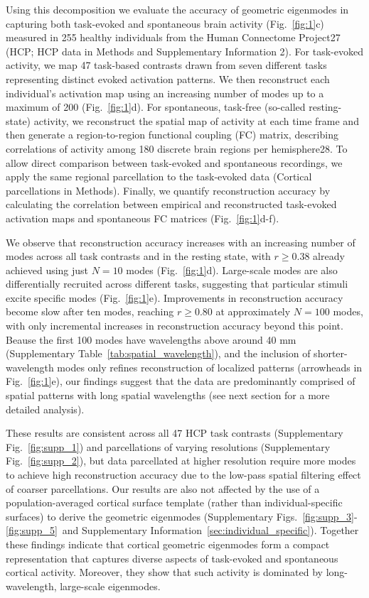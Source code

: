 \documentclass[sn-mathphys-num]{sn-jnl}%
\theoremstyle{thmstyleone}%
\theoremstyle{thmstyletwo}%
\theoremstyle{thmstylethree}%
\begin{document}
Using this decomposition we evaluate the accuracy of geometric eigenmodes in capturing both task-evoked and spontaneous brain activity (Fig.~\ref{fig:1}c) measured in 255 healthy individuals from the Human Connectome Project27 (HCP; HCP data in Methods and Supplementary Information 2). 
For task-evoked activity, we map 47 task-based contrasts drawn from seven different tasks representing distinct evoked activation patterns. 
We then reconstruct each individual’s activation map using an increasing number of modes up to a maximum of 200 (Fig.~\ref{fig:1}d). 
For spontaneous, task-free (so-called resting-state) activity, we reconstruct the spatial map of activity at each time frame and then generate a region-to-region functional coupling (FC) matrix, describing correlations of activity among 180 discrete brain regions per hemisphere28. 
To allow direct comparison between task-evoked and spontaneous recordings, we apply the same regional parcellation to the task-evoked data (Cortical parcellations in Methods). 
Finally, we quantify reconstruction accuracy by calculating the correlation between empirical and reconstructed task-evoked activation maps and spontaneous FC matrices (Fig.~\ref{fig:1}d-f).


We observe that reconstruction accuracy increases with an increasing number of modes across all task contrasts and in the resting state, with $ r \ge 0.38 $ already achieved using just $ N=10 $ modes (Fig.~\ref{fig:1}d). 
Large-scale modes are also differentially recruited across different tasks, suggesting that particular stimuli excite specific modes (Fig.~\ref{fig:1}e). 
Improvements in reconstruction accuracy become slow after ten modes, reaching $ r \geq 0.80 $ at approximately $ N=100 $ modes, with only incremental increases in reconstruction accuracy beyond this point. 
Beause the first 100 modes have wavelengths above around 40 mm (Supplementary Table~\ref{tab:spatial_wavelength}), 
and the inclusion of shorter-wavelength modes only refines reconstruction of localized patterns (arrowheads in Fig.~\ref{fig:1}e), our findings suggest that the data are predominantly comprised of spatial patterns with long spatial wavelengths (see next section for a more detailed analysis).


These results are consistent across all 47 HCP task contrasts (Supplementary Fig.~\ref{fig:supp_1}) and parcellations of varying resolutions (Supplementary Fig.~\ref{fig:supp_2}), but data parcellated at higher resolution require more modes to achieve high reconstruction accuracy due to the low-pass spatial filtering effect of coarser parcellations. 
Our results are also not affected by the use of a population-averaged cortical surface template (rather than individual-specific surfaces) to derive the geometric eigenmodes (Supplementary Figs.~\ref{fig:supp_3}-\ref{fig:supp_5}~and Supplementary Information~\ref{sec:individual_specific}). 
Together these findings indicate that cortical geometric eigenmodes form a compact representation that captures diverse aspects of task-evoked and spontaneous cortical activity. 
Moreover, they show that such activity is dominated by long-wavelength, large-scale eigenmodes.
\end{document}
